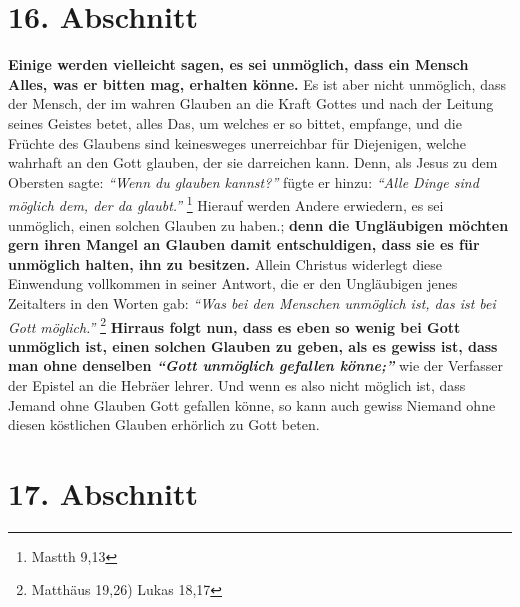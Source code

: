 \section{16. Abschnitt} \label{kap6_ab16}

\textbf{Einige werden vielleicht sagen, es sei unmöglich, dass ein Mensch Alles,
was er
bitten mag, erhalten könne.} Es ist aber nicht unmöglich, dass der Mensch, der
im
wahren Glauben an die Kraft Gottes und nach der Leitung seines Geistes betet,
alles Das, um welches er so bittet, empfange, und die Früchte des Glaubens sind
keinesweges unerreichbar für Diejenigen, welche wahrhaft an den Gott glauben,
der sie darreichen kann. Denn, als Jesus zu dem Obersten sagte:
\textit{"`Wenn du glauben kannst?"'} fügte er hinzu: \textit{"`Alle Dinge sind
möglich dem, der da glaubt."'}
\footnote{Mastth 9,13}
Hierauf werden Andere erwiedern, es sei
unmöglich, einen solchen Glauben zu haben.; \textbf{denn die Ungläubigen möchten
gern
ihren Mangel an Glauben  damit entschuldigen, dass
sie es für unmöglich halten,
ihn zu besitzen.} Allein Christus widerlegt diese Einwendung vollkommen in
seiner
Antwort, die er den Ungläubigen jenes Zeitalters in den Worten gab:
\textit{"`Was bei den Menschen unmöglich ist, das ist bei Gott möglich."'}
\footnote{Matthäus 19,26) Lukas 18,17}
\textbf{Hirraus folgt nun, dass es eben so wenig bei Gott unmöglich
ist,
einen solchen Glauben zu geben, als es gewiss ist, dass man ohne denselben
\textit{"`Gott unmöglich gefallen könne;"'}} wie der Verfasser der Epistel an
die Hebräer
lehrer. Und wenn es also nicht möglich ist, dass Jemand ohne Glauben Gott
gefallen könne, so kann auch gewiss Niemand ohne diesen köstlichen Glauben
erhörlich zu Gott beten.

\section{17. Abschnitt} \label{kap6_ab17}

